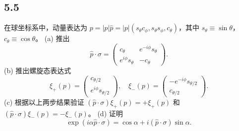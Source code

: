 \subsection{5.5}
在球坐标系中，动量表达为 $p = |p| \hat{p} = |p| (s_\theta c_\phi, s_\theta s_\phi, c_\theta)$，其中 $s_\theta \equiv \sin \theta$，$c_\theta \equiv \cos \theta$。
(a) 推出
$$\hat{p} \cdot \sigma = 
\begin{pmatrix}
c_\theta & e^{-i\phi} s_\theta \\
e^{i\phi} s_\theta & -c_\theta
\end{pmatrix}.$$
(b) 推出螺旋态表达式
$$\xi_+ (p) = 
\begin{pmatrix}
c_{\theta/2} \\
e^{i\phi} s_{\theta/2}
\end{pmatrix},
\quad \xi_- (p) = 
\begin{pmatrix}
-e^{-i\phi} s_{\theta/2} \\
c_{\theta/2}
\end{pmatrix}.$$
(c) 根据以上两步结果验证 $(\hat{p} \cdot \sigma) \xi_+ (p) = + \xi_+ (p)$ 和 $(\hat{p} \cdot \sigma) \xi_- (p) = - \xi_- (p)$。
(d) 证明
$$\exp(i\alpha \hat{p} \cdot \sigma) = \cos \alpha + i (\hat{p} \cdot \sigma) \sin \alpha.$$

\newpage
